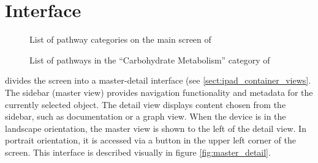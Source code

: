 \section{Interface}
\label{sect:kegg_interface}

\begin{figure}
    \caption{\label{fig:kegg_screenshot_list} List of pathway categories on
    the main screen of \keggapp}
\end{figure}

\begin{figure}
    \caption{\label{fig:kegg_screenshot_sublist} List of pathways in the
    ``Carbohydrate Metabolism'' category of \keggapp}
\end{figure}

\keggapp divides the screen into a master-detail interface (see
\ref{sect:ipad_container_views}. The sidebar (master view) provides navigation
functionality and metadata for the currently selected object. The detail view
displays content chosen from the sidebar, such as documentation or a graph view.
When the device is in the landscape orientation, the master view is shown to the
left of the detail view.  In portrait orientation, it is accessed via a button
in the upper left corner of the screen. This interface is described visually in
figure \ref{fig:master_detail}.


